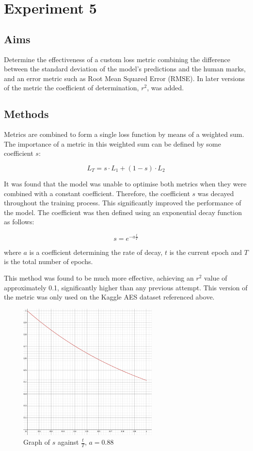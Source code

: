 \documentclass[11pt]{article}
\begin{document}
\section{Experiment 5}
\label{sec:org687f22d}
\subsection{Aims}
\label{sec:orge85cc53}
Determine the effectiveness of a custom loss metric combining the difference between the standard deviation of the model's predictions and the human marks, and an error metric such as Root Mean Squared Error (RMSE). In later versions of the metric the coefficient of determination, \(r^2\), was added.

\subsection{Methods}
\label{sec:orgeb93c27}
Metrics are combined to form a single loss function by means of a weighted sum. The importance of a metric in this weighted sum can be defined by some coefficient \(s\):

$$ L_T = s \cdot L_1 + (1-s) \cdot L_2 $$

It was found that the model was unable to optimise both metrics when they were combined with a constant coefficient. Therefore, the coefficient \(s\) was decayed throughout the training process. This significantly improved the performance of the model. The coefficient was then defined using an exponential decay function as follows:

$$ s = e^{-a\frac{t}{T}} $$

where \(a\) is a coefficient determining the rate of decay, \(t\) is the current epoch and \(T\) is the total number of epochs.

This method was found to be much more effective, achieving an \(r^2\) value of approximately 0.1, significantly higher than any previous attempt. This version of the metric was only used on the Kaggle AES dataset referenced above.

\begin{figure}[htbp]
\centering
\includegraphics[width=7cm]{./decay_nob.png}
\caption{Graph of \(s\) against \(\frac{t}{T}\), \(a = 0.88\) \label{fig:exponential_nob}}
\end{figure}
\end{document}
